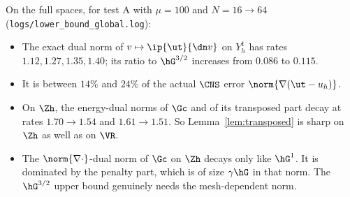 On the full spaces, for test A with $\mu=100$ and $N=16\to64$ (\texttt{logs/lower\_bound\_global.log}):
\begin{itemize}
\item The exact dual norm of $v\mapsto\ip{\ut}{\dn v}$ on $Y_h^1$ has rates $1.12,1.27,1.35,1.40$; its ratio to $\hG^{3/2}$ increases from $0.086$ to $0.115$.
\item It is between $14\%$ and $24\%$ of the actual $\CNS$ error $\norm{\nabla(\ut-u_h)}$.
\item On $\Zh$, the energy-dual norms of $\Gc$ and of its transposed part decay at rates $1.70\to1.54$ and $1.61\to1.51$. So Lemma~\ref{lem:transposed} is sharp on $\Zh$ as well as on $\VR$.
\item The $\norm{\nabla\cdot}$-dual norm of $\Gc$ on $\Zh$ decays only like $\hG^{1}$. It is dominated by the penalty part, which is of size $\gamma\hG$ in that norm. The $\hG^{3/2}$ upper bound genuinely needs the mesh-dependent norm.
\end{itemize}
